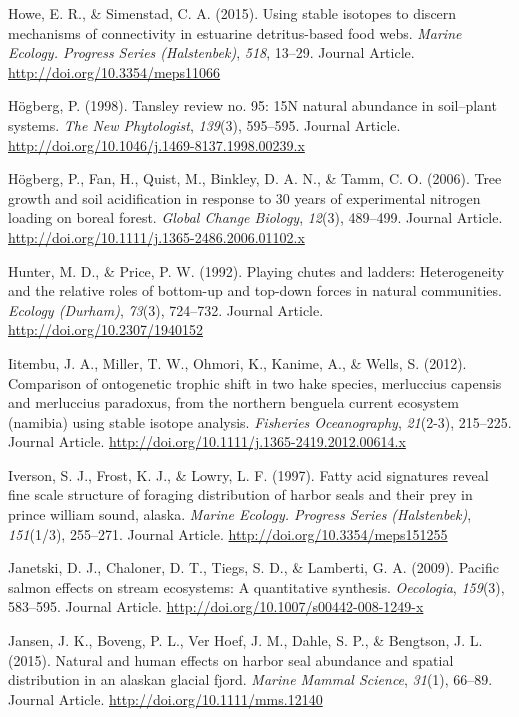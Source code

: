 \documentclass [11pt, proquest] {uwthesis}[2015/03/03]
\begin{document}
\hypertarget{ref-Howe2015}{}
Howe, E. R., \& Simenstad, C. A. (2015). Using stable isotopes to
discern mechanisms of connectivity in estuarine detritus-based food
webs. \emph{Marine Ecology. Progress Series (Halstenbek)}, \emph{518},
13--29. Journal Article. \url{http://doi.org/10.3354/meps11066}

\hypertarget{ref-Hogberg1998}{}
Högberg, P. (1998). Tansley review no. 95: 15N natural abundance in
soil--plant systems. \emph{The New Phytologist}, \emph{139}(3),
595--595. Journal Article.
\url{http://doi.org/10.1046/j.1469-8137.1998.00239.x}

\hypertarget{ref-Hogberg2006}{}
Högberg, P., Fan, H., Quist, M., Binkley, D. A. N., \& Tamm, C. O.
(2006). Tree growth and soil acidification in response to 30 years of
experimental nitrogen loading on boreal forest. \emph{Global Change
Biology}, \emph{12}(3), 489--499. Journal Article.
\url{http://doi.org/10.1111/j.1365-2486.2006.01102.x}

\hypertarget{ref-Hunter1992}{}
Hunter, M. D., \& Price, P. W. (1992). Playing chutes and ladders:
Heterogeneity and the relative roles of bottom-up and top-down forces in
natural communities. \emph{Ecology (Durham)}, \emph{73}(3), 724--732.
Journal Article. \url{http://doi.org/10.2307/1940152}

\hypertarget{ref-Iitembu2012}{}
Iitembu, J. A., Miller, T. W., Ohmori, K., Kanime, A., \& Wells, S.
(2012). Comparison of ontogenetic trophic shift in two hake species,
merluccius capensis and merluccius paradoxus, from the northern benguela
current ecosystem (namibia) using stable isotope analysis.
\emph{Fisheries Oceanography}, \emph{21}(2-3), 215--225. Journal
Article. \url{http://doi.org/10.1111/j.1365-2419.2012.00614.x}

\hypertarget{ref-Iverson1997}{}
Iverson, S. J., Frost, K. J., \& Lowry, L. F. (1997). Fatty acid
signatures reveal fine scale structure of foraging distribution of
harbor seals and their prey in prince william sound, alaska.
\emph{Marine Ecology. Progress Series (Halstenbek)}, \emph{151}(1/3),
255--271. Journal Article. \url{http://doi.org/10.3354/meps151255}

\hypertarget{ref-Janetski2009}{}
Janetski, D. J., Chaloner, D. T., Tiegs, S. D., \& Lamberti, G. A.
(2009). Pacific salmon effects on stream ecosystems: A quantitative
synthesis. \emph{Oecologia}, \emph{159}(3), 583--595. Journal Article.
\url{http://doi.org/10.1007/s00442-008-1249-x}

\hypertarget{ref-Jansen2015}{}
Jansen, J. K., Boveng, P. L., Ver Hoef, J. M., Dahle, S. P., \&
Bengtson, J. L. (2015). Natural and human effects on harbor seal
abundance and spatial distribution in an alaskan glacial fjord.
\emph{Marine Mammal Science}, \emph{31}(1), 66--89. Journal Article.
\url{http://doi.org/10.1111/mms.12140}
\end{document}
